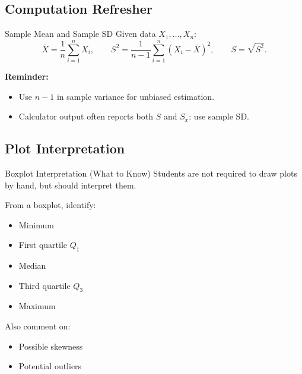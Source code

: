 \documentclass[aspectratio=169]{beamer}
\begin{document}
\subsection{Computation Refresher}
\begin{frame}{Sample Mean and Sample SD}
  Given data \(X_1,\dots,X_n\):
  \[
    \bar X=\frac{1}{n}\sum_{i=1}^n X_i,
    \qquad
    S^2=\frac{1}{n-1}\sum_{i=1}^n (X_i-\bar X)^2,
    \qquad
    S=\sqrt{S^2}.
  \]

  \vspace{2mm}
  \textbf{Reminder:}
  \begin{itemize}
    \item Use \(n-1\) in sample variance for unbiased estimation.
    \item Calculator output often reports both \(S\) and \(S_x\): use sample SD.
  \end{itemize}
\end{frame}

\subsection{Plot Interpretation}
\begin{frame}{Boxplot Interpretation (What to Know)}
  Students are not required to draw plots by hand, but should interpret them.

  \vspace{2mm}
  From a boxplot, identify:
  \begin{itemize}
    \item Minimum
    \item First quartile \(Q_1\)
    \item Median
    \item Third quartile \(Q_3\)
    \item Maximum
  \end{itemize}

  \vspace{2mm}
  Also comment on:
  \begin{itemize}
    \item Possible skewness
    \item Potential outliers
  \end{itemize}
\end{frame}
\end{document}
